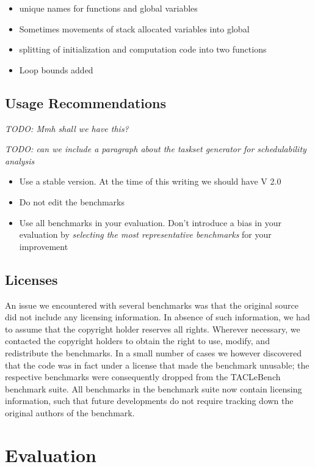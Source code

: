 \documentclass[a4paper,UKenglish]{oasics}
\newcommand{\todo}[1]{{\emph{TODO: #1}}}
\begin{document}
\begin{itemize}
\item unique names for functions and global variables
\item Sometimes movements of stack allocated variables into global
\item splitting of initialization and computation code into two functions
\item Loop bounds added
\end{itemize}


\subsection{Usage Recommendations}

\todo{Mmh shall we have this?}

\todo{can we include a paragraph about the taskset generator for schedulability analysis}

\begin{itemize}
\item Use a stable version. At the time of this writing we should have V 2.0
\item Do not edit the benchmarks
\item Use all benchmarks in your evaluation. Don't introduce a bias in your evaluation by
\emph{selecting the most representative benchmarks} for your improvement
\end{itemize}

\subsection{Licenses}

An issue we encountered with several benchmarks was that the original
source did not include any licensing information. In absence of such
information, we had to assume that the copyright holder reserves all
rights. Wherever necessary, we contacted the copyright holders to
obtain the right to use, modify, and redistribute the benchmarks. In a
small number of cases we however discovered that the code was in fact
under a license that made the benchmark unusable; the respective
benchmarks were consequently dropped from the TACLeBench benchmark
suite. All benchmarks in the benchmark suite now contain licensing
information, such that future developments do not require tracking
down the original authors of the benchmark.

\section{Evaluation}
\label{sec:eval}
\end{document}

